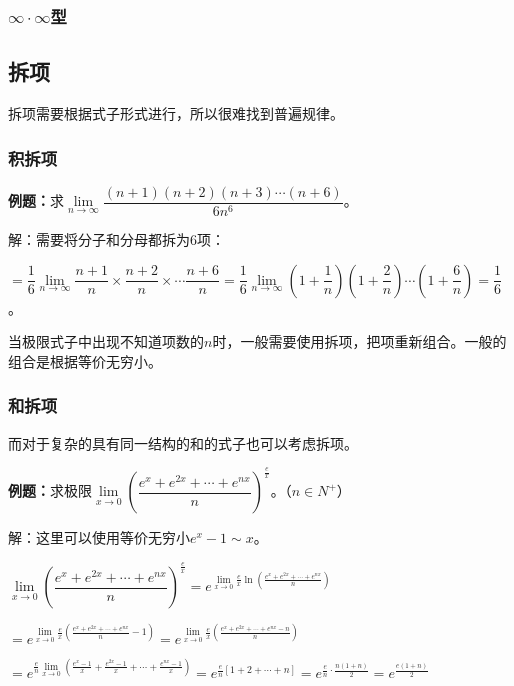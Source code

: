 \subsubsection{\texorpdfstring{$\infty\cdot\infty$}\ 型}

\subsection{拆项}

拆项需要根据式子形式进行，所以很难找到普遍规律。

\subsubsection{积拆项}

\textbf{例题：}求$\lim\limits_{n\to\infty}\dfrac{(n+1)(n+2)(n+3)\cdots(n+6)}{6n^6}$。

解：需要将分子和分母都拆为6项：

$=\dfrac{1}{6}\lim\limits_{n\to\infty}\dfrac{n+1}{n}\times\dfrac{n+2}{n}\times\cdots\dfrac{n+6}{n}=\dfrac{1}{6}\lim\limits_{n\to\infty}(1+\dfrac{1}{n})(1+\dfrac{2}{n})\cdots(1+\dfrac{6}{n})=\dfrac{1}{6}$。

当极限式子中出现不知道项数的$n$时，一般需要使用拆项，把项重新组合。一般的组合是根据等价无穷小。

\subsubsection{和拆项}

而对于复杂的具有同一结构的和的式子也可以考虑拆项。

\textbf{例题：}求极限$\lim\limits_{x\to 0}\left(\dfrac{e^x+e^{2x}+\cdots+e^{nx}}{n}\right)^{\frac{e}{x}}$。（$n\in N^+$）

解：这里可以使用等价无穷小$e^x-1\sim x$。

$\lim\limits_{x\to 0}\left(\dfrac{e^x+e^{2x}+\cdots+e^{nx}}{n}\right)^{\frac{e}{x}}=e^{\lim\limits_{x\to 0}\frac{e}{x}\ln\left(\frac{e^x+e^{2x}+\cdots+e^{nx}}{n}\right)}$

$=e^{\lim\limits_{x\to 0}\frac{e}{x}\left(\frac{e^x+e^{2x}+\cdots+e^{nx}}{n}-1\right)}=e^{\lim\limits_{x\to 0}\frac{e}{x}\left(\frac{e^x+e^{2x}+\cdots+e^{nx}-n}{n}\right)}$

$=e^{\frac{e}{n}\lim\limits_{x\to 0}\left(\frac{e^x-1}{x}+\frac{e^{2x}-1}{x}+\cdots+\frac{e^{nx}-1}{x}\right)}=e^{\frac{e}{n}[1+2+\cdots+n]}=e^{\frac{e}{n}\cdot\frac{n(1+n)}{2}}=e^{\frac{e(1+n)}{2}}$

